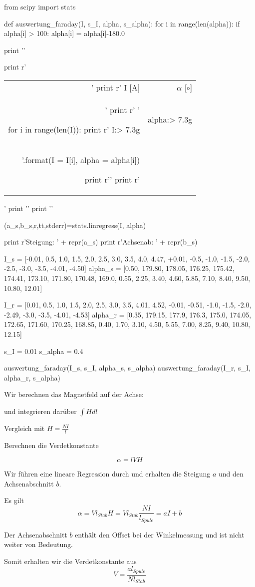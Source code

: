 \begin{python}
from scipy import stats

def auswertung_faraday(I, s_I, alpha, s_alpha):
  for i in range(len(alpha)):
    if alpha[i] > 100:
      alpha[i] = alpha[i]-180.0

  print '\n'

  print r'\begin{tabular}{rr} \toprule'
  print r' I [A] & $\alpha$ [$\circ$] \\'
  print r' \midrule '

  for i in range(len(I)):
    print r' {I:> 7.3g}  &  {alpha:> 7.3g} \\ '.format(I = I[i], alpha = alpha[i])

  print r'\bottomrule '
  print r'\end{tabular}'
  print '\n'
  print '\n'

  (a_s,b_s,r,tt,stderr)=stats.linregress(I, alpha)

  print r'Steigung: ' + repr(a_s)
  print r'Achsenab: ' + repr(b_s)


I_s = [-0.01, 0.5, 1.0, 1.5, 2.0, 2.5, 3.0, 3.5, 4.0, 4.47, +0.01, -0.5, -1.0, -1.5, -2.0, -2.5, -3.0, -3.5, -4.01, -4.50]
alpha_s = [0.50, 179.80, 178.05, 176.25, 175.42, 174.41, 173.10, 171.80, 170.48, 169.0, 0.55, 2.25, 3.40, 4.60, 5.85, 7.10, 8.40, 9.50, 10.80, 12.01]

I_r = [0.01, 0.5, 1.0, 1.5, 2.0, 2.5, 3.0, 3.5, 4.01, 4.52, -0.01, -0.51, -1.0, -1.5, -2.0, -2.49, -3.0, -3.5, -4.01, -4.53]
alpha_r = [0.35, 179.15, 177.9, 176.3, 175.0, 174.05, 172.65, 171.60, 170.25, 168.85, 0.40, 1.70, 3.10, 4.50, 5.55, 7.00, 8.25, 9.40, 10.80, 12.15]

s_I = 0.01
s_alpha = 0.4

auswertung_faraday(I_s, s_I, alpha_s, s_alpha)
auswertung_faraday(I_r, s_I, alpha_r, s_alpha)

\end{python}

Wir berechnen das Magnetfeld auf der Achse:

und integrieren darüber
$\int H dl$

Vergleich mit $ H = \frac{N I}{l} $

Berechnen die Verdetkonstante

$$ \alpha = l V H $$

Wir führen eine lineare Regression durch und erhalten die Steigung $a$ und den Achsenabschnitt $b$.

Es gilt $$ \alpha = V l_{Stab} H = V l_{Stab} \frac{N I}{l_{Spule}} = a I + b $$

Der Achsenabschnitt $b$ enthält den Offset bei der Winkelmessung und ist nicht weiter von Bedeutung.

Somit erhalten wir die Verdetkonstante aus $$ V = \frac{a l_{Spule}}{N l_{Stab}} $$  
